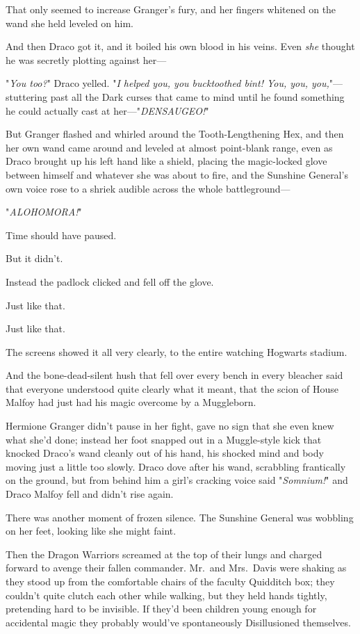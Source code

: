 That only seemed to increase Granger's fury, and her fingers whitened on the 
wand she held leveled on him.

And then Draco got it, and it boiled his own blood in his veins. Even 
\emph{she} thought he was secretly plotting against her---

"\emph{You too?}" Draco yelled. "\emph{I helped you, you bucktoothed bint! You, 
you, you,}"--- stuttering past all the Dark curses that came to mind until he 
found something he could actually cast at her---"\emph{DENSAUGEO!}"

But Granger flashed and whirled around the Tooth-Lengthening Hex, and then her 
own wand came around and leveled at almost point-blank range, even as Draco 
brought up his left hand like a shield, placing the magic-locked glove between 
himself and whatever she was about to fire, and the Sunshine General's own 
voice rose to a shriek audible across the whole battleground---

"\emph{ALOHOMORA!}"

Time should have paused.

But it didn't.

Instead the padlock clicked and fell off the glove.

Just like that.

Just like that.

The screens showed it all very clearly, to the entire watching Hogwarts stadium.

And the bone-dead-silent hush that fell over every bench in every bleacher said 
that everyone understood quite clearly what it meant, that the scion of House 
Malfoy had just had his magic overcome by a Muggleborn.

Hermione Granger didn't pause in her fight, gave no sign that she even knew 
what she'd done; instead her foot snapped out in a Muggle-style kick that 
knocked Draco's wand cleanly out of his hand, his shocked mind and body moving 
just a little too slowly. Draco dove after his wand, scrabbling frantically on 
the ground, but from behind him a girl's cracking voice said "\emph{Somnium!}" 
and Draco Malfoy fell and didn't rise again.

There was another moment of frozen silence. The Sunshine General was wobbling 
on her feet, looking like she might faint.

Then the Dragon Warriors screamed at the top of their lungs and charged forward 
to avenge their fallen commander.
\sbreak
Mr.~and Mrs.~Davis were shaking as they stood up from the comfortable chairs of 
the faculty Quidditch box; they couldn't quite clutch each other while walking, 
but they held hands tightly, pretending hard to be invisible. If they'd been 
children young enough for accidental magic they probably would've spontaneously 
Disillusioned themselves.

